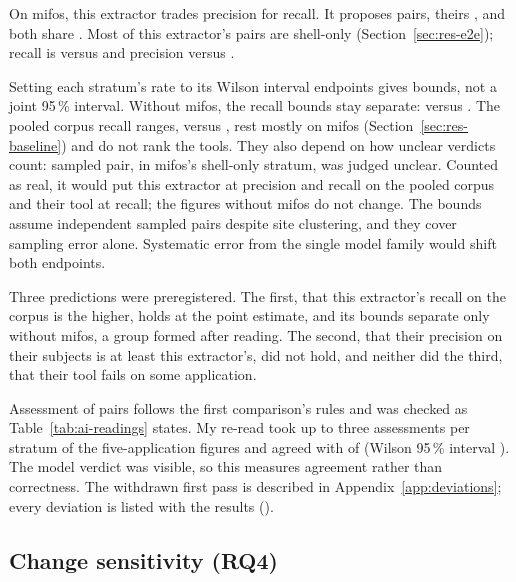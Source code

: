On mifos, this extractor trades precision for recall. It proposes \HHMifosOursPairs{} pairs,
theirs \HHMifosTheirsPairs{}, and both share \HHMifosBoth{}. Most of this extractor's pairs are
shell-only (Section~\ref{sec:res-e2e}); recall is \HHMifosOursRecall{} versus
\HHMifosTheirsRecall{} and precision \HHMifosOursPrecision{} versus \HHMifosTheirsPrecision{}.

Setting each stratum's rate to its Wilson interval endpoints gives bounds, not a joint 95\,\%
interval. Without mifos, the recall bounds stay separate: \HHCorpusNoMifosOursRecallRange{} versus
\HHCorpusNoMifosTheirsRecallRange{}. The pooled corpus recall ranges, \HHCorpusOursRecallRange{}
versus \HHCorpusTheirsRecallRange{}, rest mostly on mifos (Section~\ref{sec:res-baseline}) and do
not rank the tools. They also depend on how unclear verdicts count: \HHReadUnclear{} sampled pair, in mifos's
shell-only stratum, was judged unclear. Counted as real, it would put this extractor at
\HHCorpusOursPrecisionUnclearReal{} precision and \HHCorpusOursRecallUnclearReal{} recall on the
pooled corpus and their tool at \HHCorpusTheirsRecallUnclearReal{} recall; the figures without mifos
do not change. The bounds assume independent sampled pairs despite site clustering, and
they cover sampling error alone. Systematic error from the single model family would shift both
endpoints.

Three predictions were preregistered. The first, that this extractor's recall on the corpus is the higher, holds
at the point estimate, and its bounds separate only without mifos, a group formed after reading. The second, that their
precision on their subjects is at least this extractor's, did not hold, and neither did the third, that their tool fails on some application.

Assessment of \HHRead{} pairs follows the first comparison's rules and was checked as
Table~\ref{tab:ai-readings} states. My re-read took up to three assessments per stratum of the
five-application figures and agreed with \HHAuthorAgree{} of \HHAuthorJudged{} (Wilson 95\,\%
interval \HHAuthorAgreeRange{}). The model verdict was visible, so this measures agreement rather
than correctness. The withdrawn first pass is described in
Appendix~\ref{app:deviations}; every deviation is listed with the results
().

\subsection{Change sensitivity (RQ4)}
\label{sec:res-mutation}

